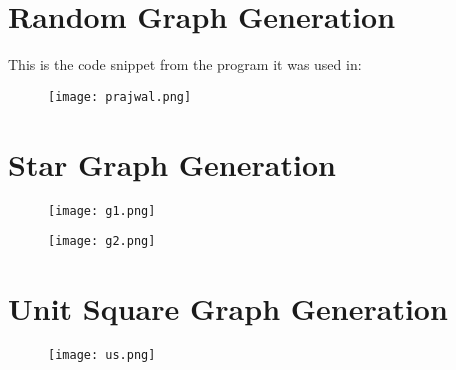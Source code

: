 \documentclass[12pt,a4paper,onecolumn]{article}
\begin{document}
\begin{appendices}
\section{Random Graph Generation}
This is the code snippet from the program it was used in:
\begin{figure}[H]
 \texttt{[image: prajwal.png]}
  
  \label{Figure 7}
\end{figure}
\section{Star Graph Generation}
\begin{figure}[H]
 \texttt{[image: g1.png]}
 
  \label{Figure 8}
\end{figure}

\begin{figure}[H]
\texttt{[image: g2.png]}
  
  \label{Figure 9}
\end{figure}
\section{Unit Square Graph Generation}
\begin{figure}[H]
 \texttt{[image: us.png]}
 
  \label{Figure 8}
\end{figure}

\end{appendices}
\end{document}
